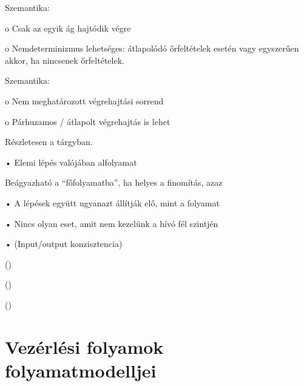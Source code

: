 Szemantika:

o Csak az egyik ág hajtódik végre

o Nemdeterminizmus lehetséges: átlapolódó őrfeltételek esetén vagy egyszerűen akkor, ha nincsenek őrfeltételek.

\begin{definicio}
\end{definicio}

Szemantika:

o Nem meghatározott végrehajtási sorrend

o Párhuzamos / átlapolt végrehajtás is lehet

Részletesen a \szgarch tárgyban.

\begin{definicio}
\end{definicio}

\begin{definicio}
\end{definicio}

• Elemi lépés valójában alfolyamat

\begin{definicio}
\end{definicio}

Beágyazható a “főfolyamatba”, ha helyes a finomítás, azaz

• A lépések együtt ugyanazt állítják elő, mint a folyamat

• Nincs olyan eset, amit nem kezelünk a hívó fél szintjén

• (Input/output konzisztencia)


 ()

 ()



 ()







\section{Vezérlési folyamok folyamatmodelljei}

